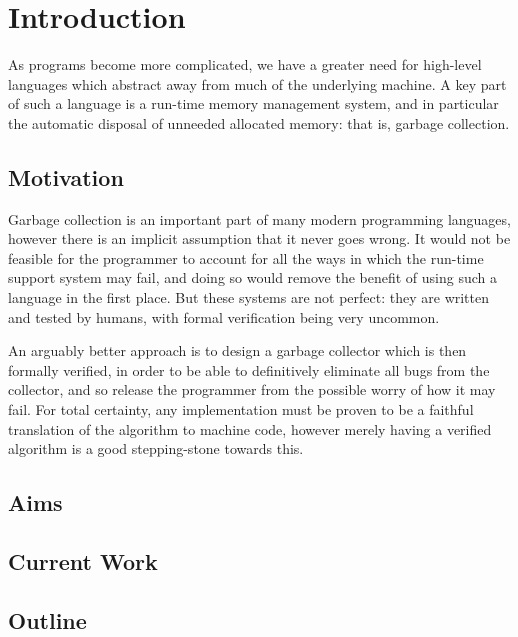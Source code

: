 \chapter{Introduction}
\label{sec:intro}

As programs become more complicated, we have a greater need for
high-level languages which abstract away from much of the underlying
machine. A key part of such a language is a run-time \gls{memory
  management} system, and in particular the automatic disposal of
unneeded allocated memory: that is, \gls{garbage collection}.

\section{Motivation}
\label{sec:intro-motivation}

Garbage collection is an important part of many modern programming
languages, however there is an implicit assumption that it never goes
wrong. It would not be feasible for the programmer to account for all
the ways in which the run-time support system may fail, and doing so
would remove the benefit of using such a language in the first
place. But these systems are not perfect: they are written and tested
by humans, with formal verification being very uncommon.

An arguably better approach is to design a \gls{garbage collector}
which is then formally verified, in order to be able to definitively
eliminate all bugs from the \gls{collector}, and so release the
programmer from the possible worry of how it may fail. For total
certainty, any implementation must be proven to be a faithful
translation of the algorithm to machine code, however merely having a
verified algorithm is a good stepping-stone towards this.

\section{Aims}
\label{sec:intro-goals}



\section{Current Work}
\label{sec:intro-current}



\section{Outline}
\label{sec:intro-outline}


